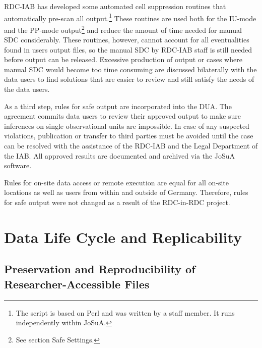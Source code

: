 RDC-IAB has developed some automated cell suppression routines that automatically pre-scan all output.\footnote{The script is based on Perl and was written by a staff member. It runs independently within JoSuA.} These routines are used both for the IU-mode and the PP-mode output\footnote{See section Safe Settings.} and reduce the amount of time needed for manual SDC considerably. These routines, however, cannot account for all eventualities found in users output files, so the manual SDC by RDC-IAB staff is still needed before output can be released. Excessive production of output or cases where manual SDC would become too time consuming are discussed bilaterally with the data users to find solutions that are easier to review and still satisfy the needs of the data users.

As a third step, rules for safe output are incorporated into the DUA. The agreement commits data users to review their approved output to make sure inferences on single observational units are impossible. In case of any suspected violations, publication or transfer to third parties must be avoided until the case can be resolved with the assistance of the RDC-IAB and the Legal Department of the IAB. All approved results are documented and archived via the JoSuA software.

Rules for on-site data access or remote execution are equal for all on-site locations as well as users from within and outside of Germany. Therefore, rules for safe output were not changed as a result of the RDC-in-RDC project.

\hypertarget{data-life-cycle-and-replicability}{%
\section{Data Life Cycle and Replicability}\label{data-life-cycle-and-replicability}}

\hypertarget{preservation-and-reproducibility-of-researcher-accessible-files}{%
\subsection{Preservation and Reproducibility of Researcher-Accessible Files}\label{preservation-and-reproducibility-of-researcher-accessible-files}}

